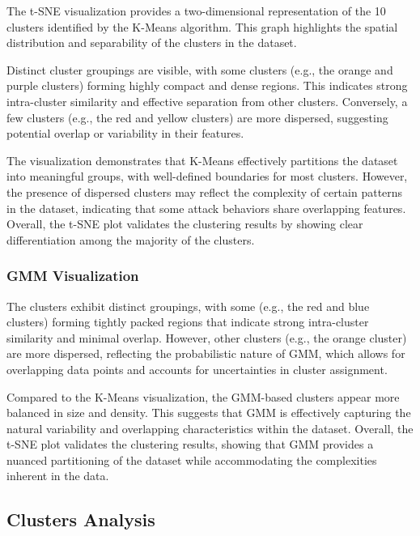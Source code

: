             The t-SNE visualization provides a two-dimensional representation of the 10 clusters identified by the K-Means algorithm. This graph highlights the spatial distribution and separability of the clusters in the dataset.

            Distinct cluster groupings are visible, with some clusters (e.g., the orange and purple clusters) forming highly compact and dense regions. This indicates strong intra-cluster similarity and effective separation from other clusters. Conversely, a few clusters (e.g., the red and yellow clusters) are more dispersed, suggesting potential overlap or variability in their features.

            The visualization demonstrates that K-Means effectively partitions the dataset into meaningful groups, with well-defined boundaries for most clusters. However, the presence of dispersed clusters may reflect the complexity of certain patterns in the dataset, indicating that some attack behaviors share overlapping features. Overall, the t-SNE plot validates the clustering results by showing clear differentiation among the majority of the clusters.
      
        \subsubsection{GMM Visualization \\}

            The clusters exhibit distinct groupings, with some (e.g., the red and blue clusters) forming tightly packed regions that indicate strong intra-cluster similarity and minimal overlap. However, other clusters (e.g., the orange cluster) are more dispersed, reflecting the probabilistic nature of GMM, which allows for overlapping data points and accounts for uncertainties in cluster assignment.

            Compared to the K-Means visualization, the GMM-based clusters appear more balanced in size and density. This suggests that GMM is effectively capturing the natural variability and overlapping characteristics within the dataset. Overall, the t-SNE plot validates the clustering results, showing that GMM provides a nuanced partitioning of the dataset while accommodating the complexities inherent in the data.

    \subsection{Clusters Analysis}

